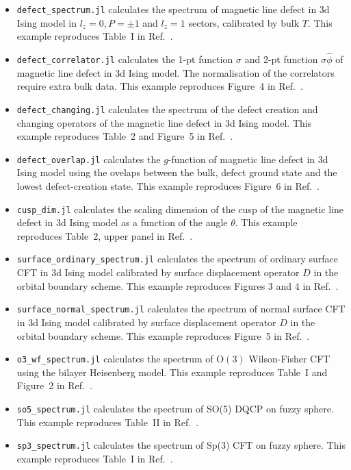 \documentclass{timesjhep}
\begin{document}
\begin{itemize}
    \item \lstinline|defect_spectrum.jl| calculates the spectrum of magnetic line defect in 3d Ising model in $l_z = 0, P = ±1$ and $l_z = 1$ sectors, calibrated by bulk $T$. This example reproduces Table~I in Ref.~\cite{Hu2023Aug}.
    \item \lstinline|defect_correlator.jl| calculates the 1-pt function $\sigma$ and 2-pt function $\sigma\hat{\phi}$ of magnetic line defect in 3d Ising model. The normalisation of the correlators require extra bulk data. This example reproduces Figure~4 in Ref.~\cite{Hu2023Aug}.
    \item \lstinline|defect_changing.jl| calculates the spectrum of the defect creation and changing operators of the magnetic line defect in 3d Ising model. This example reproduces Table~2 and Figure~5 in Ref.~\cite{Zhou2024Jan}.
    \item \lstinline|defect_overlap.jl| calculates the $g$-function of magnetic line defect in 3d Ising model using the ovelaps between the bulk, defect ground state and the lowest defect-creation state. This example reproduces Figure~6 in Ref.~\cite{Zhou2024Jan}.
    \item \lstinline|cusp_dim.jl| calculates the scaling dimension of the cusp of the magnetic line defect in 3d Ising model as a function of the angle $\theta$. This example reproduces Table~2, upper panel in Ref.~\cite{Cuomo2024}.
    \item \lstinline|surface_ordinary_spectrum.jl| calculates the spectrum of ordinary surface CFT in 3d Ising model calibrated by surface displacement operator $D$ in the orbital boundary scheme. This example reproduces Figures 3 and 4 in Ref.~\cite{Zhou2024Jul}.
    \item \lstinline|surface_normal_spectrum.jl| calculates the spectrum of normal surface CFT in 3d Ising model calibrated by surface displacement operator $D$ in the orbital boundary scheme. This example reproduces Figure~5 in Ref.~\cite{Zhou2024Jul}.
    \item \lstinline|o3_wf_spectrum.jl| calculates the spectrum of $\mathrm{O}(3)$ Wilson-Fisher CFT using the bilayer Heisenberg model. This example reproduces Table~I and Figure~2 in Ref.~\cite{Han2023Dec}.
    \item \lstinline|so5_spectrum.jl| calculates the spectrum of SO(5) DQCP on fuzzy sphere. This example reproduces Table~II in Ref.~\cite{Zhou2023}.
    \item \lstinline|sp3_spectrum.jl| calculates the spectrum of Sp(3) CFT on fuzzy sphere. This example reproduces Table~I in Ref.~\cite{Zhou2024Oct}.

\end{itemize}
\end{document}
